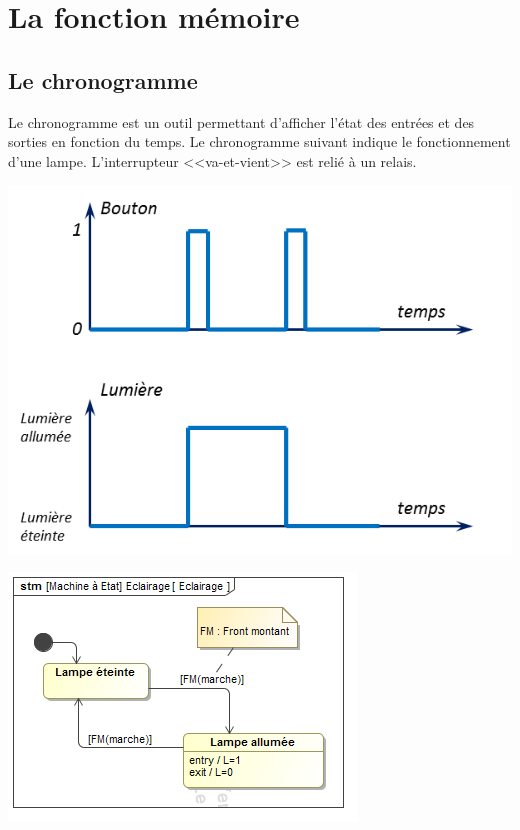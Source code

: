 \documentclass[10pt,fleqn]{article} %
\begin{document}

\setlength{\columnseprule}{.1pt}

\vspace{2cm}
\pagestyle{fancy}
\thispagestyle{plain}


\section{La fonction mémoire}

\subsection{Le chronogramme}
Le chronogramme est un outil permettant d'afficher l'état des entrées et des sorties en fonction du temps. Le chronogramme suivant indique le fonctionnement d'une lampe. L'interrupteur <<va-et-vient>> est relié à un relais. 

\begin{minipage}[c]{.47\linewidth}
\begin{center}
\includegraphics[width=.9\textwidth]{images/Chrono1}
\end{center}
\end{minipage} \hfill
\begin{minipage}[c]{.47\linewidth}
\begin{center}
\includegraphics[width=.95\textwidth]{images/stm1}
\end{center}
\end{minipage}
\end{document}
